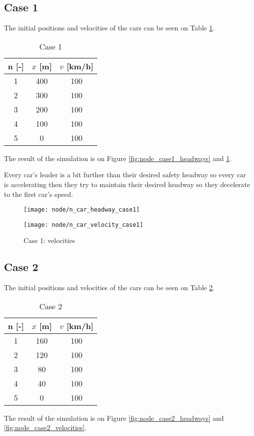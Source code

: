 		\subsection*{Case 1}
		The initial positions and velocities of the cars can be seen on Table \ref{tab:node_case1}.
		\begin{table}
			\centering
			\begin{tabular}{ |c|c|c| }
				\hline
				n [-] & $x$ [m] & $v$ [km/h]\\
				\hline
				1 & 400 & 100 \\
				2 & 300 & 100 \\
				3 & 200 & 100 \\
				4 & 100 & 100 \\
				5 & 0 & 100 \\
				\hline
			\end{tabular}
			\caption{Case 1}
			\label{tab:node_case1}
		\end{table}
		The result of the simulation is on Figure \ref{fig:node_case1_headways} and \ref{fig:node_case1_velocities}. 

		Every car's leader is a bit further than their desired safety headway so every car is accelerating then they try to maintain their desired headway so they decelerate to the first car's speed.
		\begin{figure}
			\centering
			\begin{minipage}{.5\textwidth}
				\centering
				\texttt{[image: node/n\_car\_headway\_case1]}
				\caption{Case 1: headways}
				\label{fig:node_case1_headways}
			\end{minipage}\hfill
			\begin{minipage}{.5\textwidth}
				\centering
				\texttt{[image: node/n\_car\_velocity\_case1]}
				\caption{Case 1: velocities}
				\label{fig:node_case1_velocities}
			\end{minipage}
		\end{figure}
		\subsection*{Case 2}
		The initial positions and velocities of the cars can be seen on Table \ref{tab:node_case2}.
		\begin{table}
			\centering
			\begin{tabular}{ |c|c|c| }
				\hline
				n [-] & $x$ [m] & $v$ [km/h]\\
				\hline
				1 & 160 & 100 \\
				2 & 120 & 100 \\
				3 & 80 & 100 \\
				4 & 40 & 100 \\
				5 & 0 & 100 \\
				\hline
			\end{tabular}
			\caption{Case 2}
			\label{tab:node_case2}
		\end{table}
		The result of the simulation is on  Figure \ref{fig:node_case2_headways} and \ref{fig:node_case2_velocities}. 

